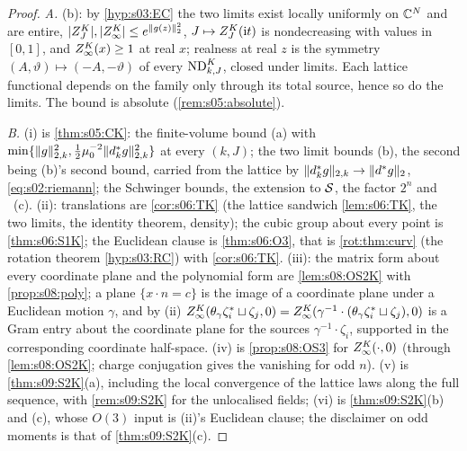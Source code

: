 \begin{proof}
\emph{A.} (b): by \cref{hyp:s03:EC} the two limits exist locally uniformly on $\mathbb C^N$ and are entire, $|Z^{K}_{J}|,|Z^{K}_{\infty}|\le e^{\lVert g(z)\rVert_2^2}$, $J\mapsto Z^{K}_{J}(\mathrm it)$ is nondecreasing with values in $[0,1]$, and $Z^{K}_{\infty}(x)\ge1$ at real $x$; realness at real $z$ is the symmetry $(A,\vartheta)\mapsto(-A,-\vartheta)$ of every $\mathrm{ND}^{K}_{k,J}$, closed under limits. Each lattice functional depends on the family only through its total source, hence so do the limits. The bound is absolute (\cref{rem:s05:absolute}).

\emph{B.} (i) is \cref{thm:s05:CK}: the finite-volume bound (a) with $\min\{\lVert g\rVert^2_{2,k},\frac12\mu_0^{-2}\lVert d^{*}_kg\rVert^2_{2,k}\}$ at every $(k,J)$; the two limit bounds (b), the second being (b)'s second bound, carried from the lattice by $\lVert d^{*}_kg\rVert_{2,k}\to\lVert d^{*} g\rVert_2$, \eqref{eq:s02:riemann}; the Schwinger bounds, the extension to $\mathcal S$, the factor $2^n$ and \Ezz\ (c). (ii): translations are \cref{cor:s06:TK} (the lattice sandwich \cref{lem:s06:TK}, the two limits, the identity theorem, density); the cubic group about every point is \cref{thm:s06:S1K}; the Euclidean clause is \cref{thm:s06:O3}, that is \cref{rot:thm:curv} (the rotation theorem \cref{hyp:s03:RC}) with \cref{cor:s06:TK}. (iii): the matrix form about every coordinate plane and the polynomial form are \cref{lem:s08:OS2K} with \cref{prop:s08:poly}; a plane $\{x\cdot n=c\}$ is the image of a coordinate plane under a Euclidean motion $\gamma$, and by (ii) $Z^{K}_{\infty}(\theta_\gamma\zeta_i^*\sqcup\zeta_j,0)=Z^{K}_{\infty}(\gamma^{-1}\cdot(\theta_\gamma\zeta_i^*\sqcup\zeta_j),0)$ is a Gram entry about the coordinate plane for the sources $\gamma^{-1}\cdot\zeta_i$, supported in the corresponding coordinate half-space. (iv) is \cref{prop:s08:OS3} for $Z^{K}_{\infty}(\cdot,0)$ (through \cref{lem:s08:OS2K}; charge conjugation gives the vanishing for odd $n$). (v) is \cref{thm:s09:S2K}(a), including the local convergence of the lattice laws along the full sequence, with \cref{rem:s09:S2K} for the unlocalised fields; (vi) is \cref{thm:s09:S2K}(b) and (c), whose $O(3)$ input is (ii)'s Euclidean clause; the disclaimer on odd moments is that of \cref{thm:s09:S2K}(c).


\end{proof}
